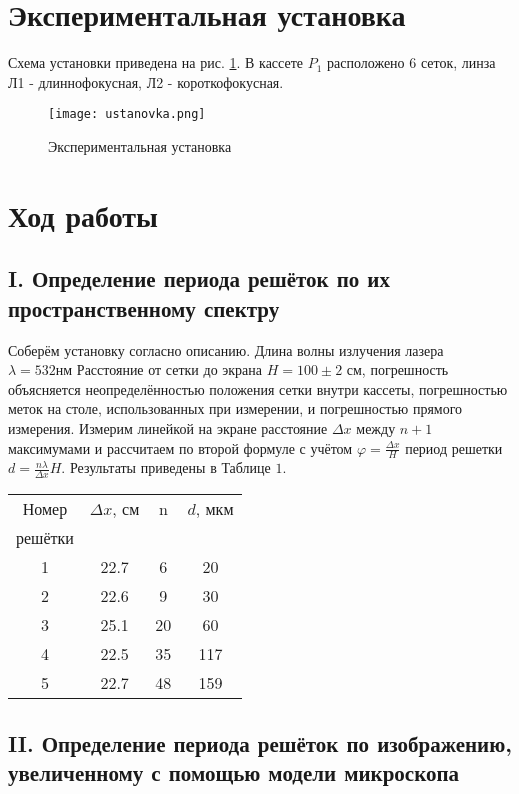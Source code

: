 \documentclass{article}
\begin{document}
\section{Экспериментальная установка}

Схема установки приведена на рис. \ref{ust}. В кассете $P_1$ расположено 6 сеток, линза Л1 - длиннофокусная, Л2 - короткофокусная.

\begin{figure}[h]
    \centering
    \texttt{[image: ustanovka.png]}
    \caption{Экспериментальная установка}
    \label{ust}
\end{figure}

\section{Ход работы}
\subsection*{I. Определение периода решёток по их пространственному спектру}

Соберём установку согласно описанию. Длина волны излучения лазера $\lambda=532 \mathrm{нм}$
Расстояние от сетки до экрана $H=100 \pm 2$ см, погрешность объясняется неопределённостью положения сетки внутри кассеты, погрешностью меток на столе, использованных при измерении, и погрешностью прямого измерения. Измерим линейкой на экране расстояние $\Delta x$ между $n+1$ максимумами и рассчитаем по второй формуле с учётом $\varphi=\frac{\Delta x}{H}$ период решетки $d = \frac{n\lambda}{\Delta x}H$. Результаты приведены в Таблице $1 .$

\begin{tabular}{|c|c|c|c|}
\hline
Номер &$\Delta x$, см &  n&$d$, мкм\\
решётки&		&			& \\
\hline
1 &	22.7	&6	& 		20	\\
\hline
2&	22.6	&	9	&	30		\\
\hline
3&	25.1	&20		&	60		\\
\hline
4&	22.5	&	35	&	117		\\
\hline
5&	22.7	&	48	&		159	\\
\hline
\end{tabular}
\newline





\subsection*{II. Определение периода решёток по изображению, увеличенному с помощью модели микроскопа}
\end{document}
